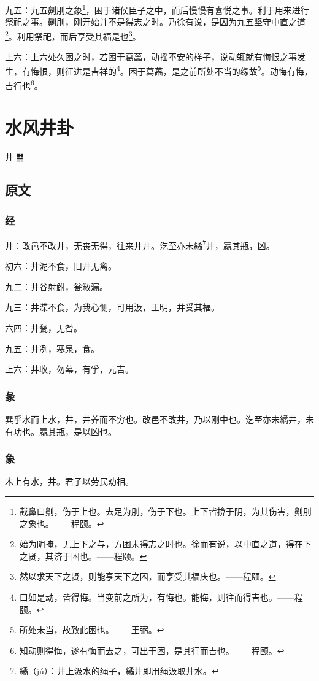 \documentclass[12pt,oneside]{book}
\begin{document}
九五：九五劓刖之象\footnote{截鼻曰劓，伤于上也。去足为刖，伤于下也。上下皆揜于阴，为其伤害，劓刖之象也。——程颐。}，困于诸侯臣子之中，而后慢慢有喜悦之事。利于用来进行祭祀之事。劓刖，刚开始并不是得志之时。乃徐有说，是因为九五坚守中直之道\footnote{始为阴掩，无上下之与，方困未得志之时也。徐而有说，以中直之道，得在下之贤，其济于困也。——程颐。}。利用祭祀，而后享受其福是也\footnote{然以求天下之贤，则能亨天下之困，而享受其福庆也。——程颐。}。

上六：上六处久困之时，若困于葛藟，动摇不安的样子，说动辄就有悔恨之事发生，有悔恨，则征进是吉祥的\footnote{曰如是动，皆得悔。当变前之所为，有悔也。能悔，则往而得吉也。——程颐。}。困于葛藟，是之前所处不当的缘故\footnote{所处未当，故致此困也。——王弼。}。动悔有悔，吉行也\footnote{知动则得悔，遂有悔而去之，可出于困，是其行而吉也。——程颐。}。


\chapter{水风井卦}
井 {\Large ䷯}

\section{原文}

\subsection{经}
井：改邑不改井，无丧无得，往来井井。汔至亦未繘\footnote{繘（jú）：井上汲水的绳子，繘井即用绳汲取井水。}井，羸其瓶，凶。

初六：井泥不食，旧井无禽。

九二：井谷射鲋，瓮敝漏。

九三：井渫不食，为我心恻，可用汲，王明，并受其福。

六四：井甃，无咎。

九五：井冽，寒泉，食。

上六：井收，勿幕，有孚，元吉。

\subsection{彖}
巽乎水而上水，井，井养而不穷也。改邑不改井，乃以刚中也。汔至亦未繘井，未有功也。羸其瓶，是以凶也。

\subsection{象}
木上有水，井。君子以劳民劝相。
\end{document}
